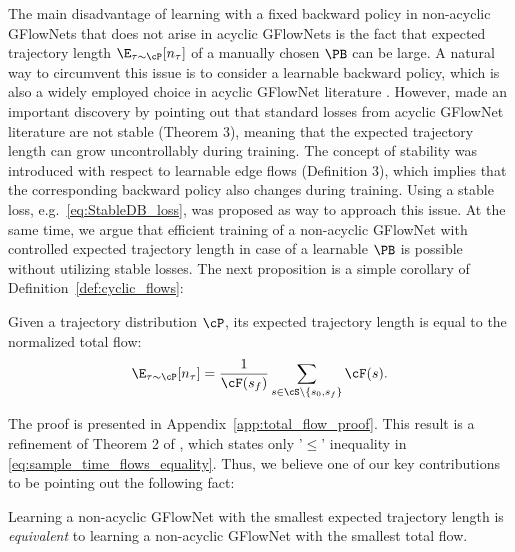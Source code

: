 The main disadvantage of learning with a fixed backward policy in non-acyclic GFlowNets that does not arise in acyclic GFlowNets is the fact that expected trajectory length $\E_{\tau \sim \cP}[n_{\tau}]$ of a manually chosen $\PB$ can be large. A natural way to circumvent this issue is to consider a learnable backward policy, which is also a widely employed choice in acyclic GFlowNet literature \cite{malkin2022trajectory, jang2024pessimistic,gritsaev2024optimizing}. However, \cite{brunswic2024theory} made an important discovery by pointing out that standard losses from acyclic GFlowNet literature are not stable (Theorem 3), meaning that the expected trajectory length can grow uncontrollably during training. The concept of stability was introduced with respect to learnable edge flows (Definition 3), which implies that the corresponding backward policy also changes during training. Using a stable loss, e.g.~\eqref{eq:StableDB_loss}, was proposed as way to approach this issue. At the same time, we argue that efficient training of a non-acyclic GFlowNet with controlled expected trajectory length in case of a learnable $\PB$ is possible without utilizing stable losses. The next proposition is a simple corollary of Definition~\ref{def:cyclic_flows}:
\begin{proposition}
\label{th:total_flow}
    Given a trajectory distribution $\cP$, its expected trajectory length is equal to the normalized total flow:
    \begin{equation}
    \label{eq:sample_time_flows_equality}
    \E_{\tau \sim \cP}[n_\tau] = \frac{1}{\cF(s_f)} \sum\limits_{s \in \cS \setminus \{s_0, s_f\}} \cF(s).
    \end{equation}
\end{proposition}
The proof is presented in Appendix~\ref{app:total_flow_proof}.
This result is a refinement of Theorem 2 of \cite{brunswic2024theory}, which states only '$\leq$' inequality in \eqref{eq:sample_time_flows_equality}. Thus, we believe one of our key contributions to be pointing out the following fact:

\begin{tcolorbox}[colback=colorblue,
    colframe=black,
    arc=4pt,
    boxsep=0.3pt,
]Learning a non-acyclic GFlowNet with the smallest expected trajectory length is \textit{equivalent} to learning a non-acyclic GFlowNet with the smallest total flow.
\end{tcolorbox}

